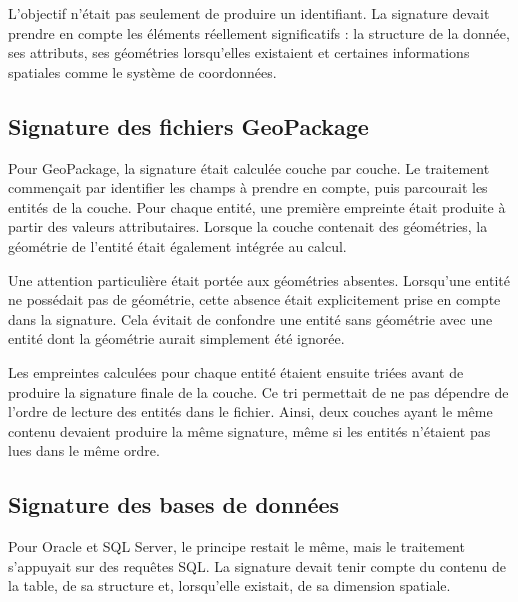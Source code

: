 L'objectif n'était pas seulement de produire un identifiant. La signature devait
prendre en compte les éléments réellement significatifs : la structure de la
donnée, ses attributs, ses géométries lorsqu'elles existaient et certaines
informations spatiales comme le système de coordonnées.


\subsection{Signature des fichiers GeoPackage}
\label{subsec:signature_geopackage}

Pour GeoPackage, la signature était calculée couche par couche. Le traitement
commençait par identifier les champs à prendre en compte, puis parcourait les
entités de la couche. Pour chaque entité, une première empreinte était produite
à partir des valeurs attributaires. Lorsque la couche contenait des géométries,
la géométrie de l'entité était également intégrée au calcul.

Une attention particulière était portée aux géométries absentes. Lorsqu'une
entité ne possédait pas de géométrie, cette absence était explicitement prise en
compte dans la signature. Cela évitait de confondre une entité sans géométrie
avec une entité dont la géométrie aurait simplement été ignorée.

Les empreintes calculées pour chaque entité étaient ensuite triées avant de
produire la signature finale de la couche. Ce tri permettait de ne pas dépendre
de l'ordre de lecture des entités dans le fichier. Ainsi, deux couches ayant le
même contenu devaient produire la même signature, même si les entités n'étaient
pas lues dans le même ordre.


\subsection{Signature des bases de données}
\label{subsec:signature_bases_donnees}

Pour Oracle et SQL Server, le principe restait le même, mais le traitement
s'appuyait sur des requêtes SQL. La signature devait tenir compte du contenu de
la table, de sa structure et, lorsqu'elle existait, de sa dimension spatiale.

